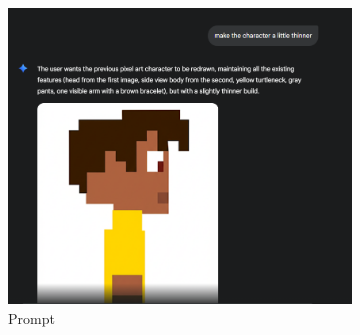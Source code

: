 \begin{figure}[htbp]
    \centering
    \caption{\small Processo da geração 19 do sprite em side view no Gemini Pro em julho/2025}
    \label{fig:geminiPro19}

    \begin{subfigure}{0.8\linewidth}
        \includegraphics[width=1\linewidth]{figs/geminiPro/chat6/tela3.PNG}
        \caption{\small Prompt}
        \label{fig:geminiPro19Prompt}
    \end{subfigure}
    \begin{subfigure}{0.3\linewidth}

\end{subfigure}
\end{figure}
